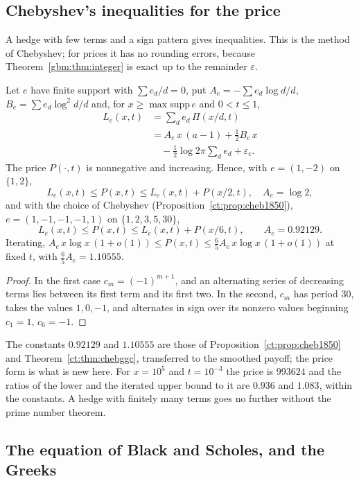 \subsection{Chebyshev's inequalities for the price}

A hedge with few terms and a sign pattern gives inequalities. This is the method of Chebyshev; for prices it has no rounding errors, because Theorem~\ref{gbm:thm:integer} is exact up to the remainder $\varepsilon$.

\begin{theorem}\label{gbm:thm:chebprice}
Let $e$ have finite support with $\sum e_d/d=0$, put $A_e=-\sum e_d\log d/d$, $B_e=\sum e_d\log^2d/d$ and, for $x\ge\max\mathrm{supp}\,e$ and $0<t\le1$,
\[
\begin{aligned}
L_e(x,t)&=\sum_de_d\,\Pi(x/d,t)\\&=A_e\,x\,(a-1)+\tfrac12B_e\,x\\&\quad-\tfrac12\log2\pi\sum_de_d+\varepsilon_e .
\end{aligned}
\]
The price $P(\cdot,t)$ is nonnegative and increasing. Hence, with $e=(1,-2)$ on $\{1,2\}$,
\[
L_e(x,t)\le P(x,t)\le L_e(x,t)+P(x/2,t),\quad A_e=\log2,
\]
and with the choice of Chebyshev (Proposition~\ref{ct:prop:cheb1850}), $e=(1,-1,-1,-1,1)$ on $\{1,2,3,5,30\}$,
\[
L_e(x,t)\le P(x,t)\le L_e(x,t)+P(x/6,t),\qquad A_e=0.92129 .
\]
Iterating, $A_e\,x\log x\,(1+o(1))\le P(x,t)\le\frac65A_e\,x\log x\,(1+o(1))$ at fixed $t$, with $\frac65A_e=1.10555$.
\end{theorem}

\begin{proof}
In the first case $c_m=(-1)^{m+1}$, and an alternating series of decreasing terms lies between its first term and its first two. In the second, $c_m$ has period $30$, takes the values $1,0,-1$, and alternates in sign over its nonzero values beginning $c_1=1$, $c_6=-1$.
\end{proof}

The constants $0.92129$ and $1.10555$ are those of Proposition~\ref{ct:prop:cheb1850} and Theorem~\ref{ct:thm:chebggc}, transferred to the smoothed payoff; the price form is what is new here. For $x=10^5$ and $t=10^{-3}$ the price is $993624$ and the ratios of the lower and the iterated upper bound to it are $0.936$ and $1.083$, within the constants. A hedge with finitely many terms goes no further without the prime number theorem.

\subsection{The equation of Black and Scholes, and the Greeks}

